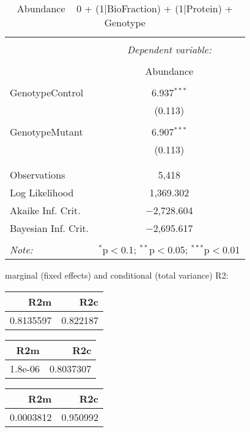 \documentclass[11pt]{report}
\begin{document}
\begin{table}[!htbp] \centering 
  \caption{Abundance ~ 0 + (1|BioFraction) + (1|Protein) + Genotype} 
  \label{} 
\begin{tabular}{@{\extracolsep{5pt}}lc} 
\\[-1.8ex]\hline 
\hline \\[-1.8ex] 
 & \multicolumn{1}{c}{\textit{Dependent variable:}} \\ 
\cline{2-2} 
\\[-1.8ex] & Abundance \\ 
\hline \\[-1.8ex] 
 GenotypeControl & 6.937$^{***}$ \\ 
  & (0.113) \\ 
  & \\ 
 GenotypeMutant & 6.907$^{***}$ \\ 
  & (0.113) \\ 
  & \\ 
\hline \\[-1.8ex] 
Observations & 5,418 \\ 
Log Likelihood & 1,369.302 \\ 
Akaike Inf. Crit. & $-$2,728.604 \\ 
Bayesian Inf. Crit. & $-$2,695.617 \\ 
\hline 
\hline \\[-1.8ex] 
\textit{Note:}  & \multicolumn{1}{r}{$^{*}$p$<$0.1; $^{**}$p$<$0.05; $^{***}$p$<$0.01} \\ 
\end{tabular} 
\end{table} 
marginal (fixed effects) and conditional (total variance) R2:

\begin{tabular}{r|r}
\hline
R2m & R2c\\
\hline
0.8135597 & 0.822187\\
\hline
\end{tabular}

\begin{tabular}{r|r}
\hline
R2m & R2c\\
\hline
1.8e-06 & 0.8037307\\
\hline
\end{tabular}

\begin{tabular}{r|r}
\hline
R2m & R2c\\
\hline
0.0003812 & 0.950992\\
\hline
\end{tabular}
\end{document}
